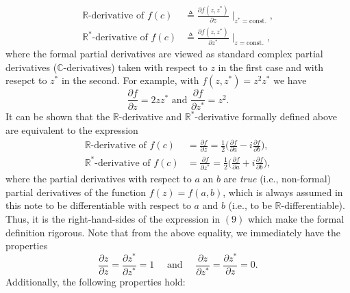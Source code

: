 \documentclass[11pt]{article}
\begin{document}
\begin{equation}
\begin{split}
\mathbb R\text{-derivative of } f(c) &\triangleq \frac{\partial f(z, z^*)}{\partial z}\mid_{z^* = \text{const.}},\\%
\mathbb R^*\text{-derivative of } f(c)&\triangleq \frac{\partial f(z, z^*)}{\partial z^*}\mid_{z = \text{const.}},%
\end{split}
\end{equation}
where the formal partial derivatives are viewed as standard complex partial derivatives ($\mathbb C$-derivatives) taken with respect to $z$ in the first case and with resepct to $z^*$ in the second. For example, with $f(z, z^*) = z^2 z^*$ we have
$$ \frac{\partial f}{\partial z} = 2zz^*\text{  and   }\frac{\partial f}{\partial z^*} = z^2.$$
It can be shown that the $\mathbb R$-derivative and $\mathbb R^*$-derivative formally defined above are equivalent to the expression
\begin{equation}
\begin{split}
\mathbb R\text{-derivative of } f(c) &=\frac{\partial f}{\partial z}  = \frac{1}{2}\Big(\frac{\partial f}{\partial a} - i\frac{\partial f}{\partial b}\Big),\\
\mathbb R^*\text{-derivative of } f(c)& =\frac{\partial f}{\partial z^*}  = \frac{1}{2}\Big(\frac{\partial f}{\partial a} + i\frac{\partial f}{\partial b}\Big),
\end{split}
\end{equation}
where the partial derivatives with respect to $a$ an $b$ are \textit{true} (i.e., non-formal) partial derivatives of the function $f(z) = f(a,b)$, which is always assumed in this note to be differentiable with respect to $a$ and $b$ (i.e., to be $\mathbb R$-differentiable). Thus, it is the right-hand-sides of the expression in $(9)$ which make the formal definition rigorous. Note that from the above equality, we immediately have the properties
$$\frac{\partial z}{\partial z}=\frac{\partial z^*}{\partial z^*} = 1\quad\text{ and  } \quad\frac{\partial z}{\partial z^*}=\frac{\partial z^*}{\partial z}=0.$$
Additionally, the following properties hold:
\end{document}
